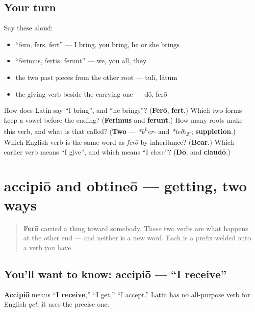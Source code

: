 \subsection*{Your turn}
Say these aloud:

\begin{itemize}
\raggedright
  \item \textquotedblleft{}ferō, fers, fert\textquotedblright{} — I bring, you bring, he or she brings
  \item \textquotedblleft{}ferimus, fertis, ferunt\textquotedblright{} — we, you all, they
  \item the two past pieces from the other root — tulī, lātum
  \item the giving verb beside the carrying one — dō, ferō
\end{itemize}

\begin{tcolorbox}[breakable,colback=teal!4,colframe=teal!35!black,title={Before you move on}]
How does Latin say \textquotedblleft{}I bring\textquotedblright{}, and \textquotedblleft{}he brings\textquotedblright{}? (\textbf{Ferō}, \textbf{fert}.) Which two forms keep a vowel before the ending? (\textbf{Ferimus} and \textbf{ferunt}.) How many roots make this verb, and what is that called? (\textbf{Two} — \emph{*b\textsuperscript{h}er-} and \emph{*telh\textsubscript{2}-}; \textbf{suppletion}.) Which English verb is the same word as \emph{ferō} by inheritance? (\textbf{Bear}.) Which earlier verb means \textquotedblleft{}I give\textquotedblright{}, and which means \textquotedblleft{}I close\textquotedblright{}? (\textbf{Dō}, and \textbf{claudō}.)
\end{tcolorbox}
\section[accipiō, obtineō]{accipiō and obtineō — getting, two ways}

\label{lesson:LA-C42-accipio}



\begin{quote}
\textbf{Ferō} carried a thing toward somebody. These two verbs are what happens at the other end — and neither is a new word. Each is a prefix welded onto a verb you have.
\end{quote}

\subsection*{You'll want to know: accipiō — \textquotedblleft{}I receive\textquotedblright{}}
\textbf{Accipiō} means \textquotedblleft{}\textbf{I receive},\textquotedblright{} \textquotedblleft{}I get,\textquotedblright{} \textquotedblleft{}I accept.\textquotedblright{} Latin has no all-purpose verb for English \emph{get}; it uses the precise one.

